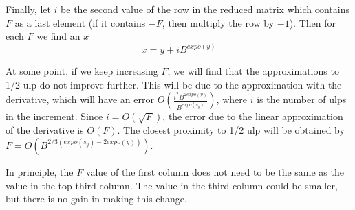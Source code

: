 \documentclass{article}
\begin{document}
Finally, let $i$ be the second value of the row in the reduced
matrix which contains $F$ as a last element (if it contains $-F$, then
multiply the row by $-1$).  Then for each $F$ we find an $x$
\[ x = y + i B^{expo(y)} \]

At some point, if we keep increasing $F$, we will find that the
approximations to 1/2 ulp do not improve further.  This will be
due to the approximation with the derivative, which will have
an error $O( \frac{ i^2 B^{2expo(y)}}{B^{expo(s_y)}} )$, where
$i$ is the number of ulps in the increment.  Since $i = O( \sqrt{F} )$,
the error due to the linear approximation of the derivative is $O( F )$.
The closest proximity to 1/2 ulp will be obtained
by $F = O( B^{2/3(expo(s_y)-2expo(y))} )$.

In principle, the $F$ value of the first column does not need to be
the same as the value in the top third column.  The value in the
third column could be smaller, but there is no gain in making this
change.
\end{document}
